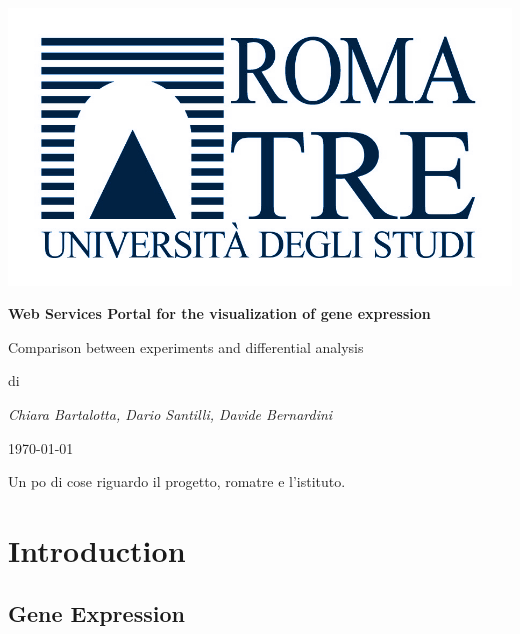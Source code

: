 \documentclass[a4paper]{report}
\begin{document}
\begin{titlepage}
\centering
{}
\includegraphics{logoRomaTre.jpg}\\
{\LARGE \bf Web Services Portal for the visualization of gene expression\par}
\vspace{0.5cm}
{\Large Comparison between experiments and differential analysis\par} 
\vspace{2cm}
di\\
{\Large \em Chiara Bartalotta, Dario Santilli, Davide Bernardini\par}
\date{\currenttime}
\today
\end{titlepage}

\begin{Large}
Un po di cose riguardo il progetto, romatre e l'istituto.\\
\end{Large}

\tableofcontents

\part{Introduction}
\chapter{Gene Expression}
\end{document}
